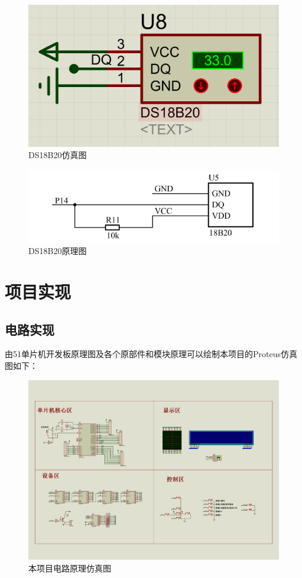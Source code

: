 \documentclass{textreportclass}  %
\begin{document}
	\begin{figure}[htbp]
		\centering
		\includegraphics[scale=0.3]{Fig/DS18.png}
		\caption{DS18B20仿真图}\label{Fig.31}
	\end{figure}
	
	
	\begin{figure}[htbp]
		\centering
		\includegraphics[scale=0.3]{Fig/DS18B2.png}
		\caption{DS18B20原理图}\label{Fig.32}
	\end{figure}
	
	
\section{项目实现}					 		%
	
	
	\subsection{电路实现}                       %
	由51单片机开发板原理图及各个原部件和模块原理可以绘制本项目的Proteus仿真图如下：
	
	\begin{figure}[htbp]
	\centering
	\includegraphics[scale=0.2]{Fig/项目仿真图.pdf}
	\caption{本项目电路原理仿真图}\label{Fig.33}
	\end{figure}
\end{document}

